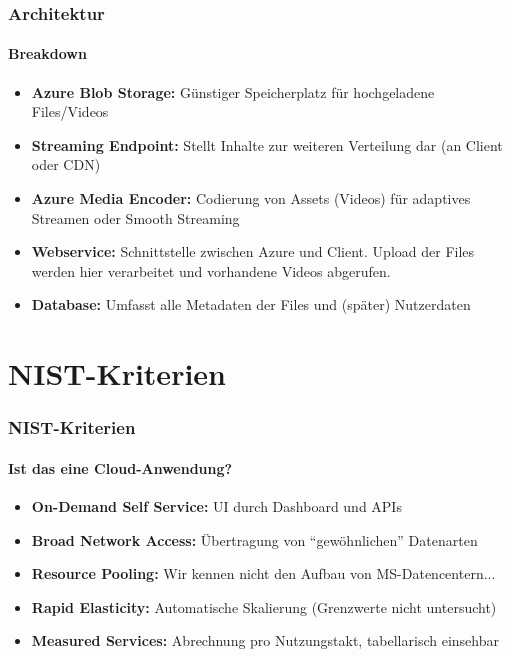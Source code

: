 \documentclass[aspectratio=169]{beamer}
\begin{document}
\begin{frame}
  \frametitle{Architektur}
  \framesubtitle{Breakdown}
  \begin{itemize}
    \item \textbf{Azure Blob Storage:} Günstiger Speicherplatz für hochgeladene Files/Videos
    \item \textbf{Streaming Endpoint:} Stellt Inhalte zur weiteren Verteilung dar (an Client oder CDN)
    \item \textbf{Azure Media Encoder:} Codierung von Assets (Videos) für adaptives Streamen oder Smooth Streaming
    \item \textbf{Webservice:} Schnittstelle zwischen Azure und Client. Upload der Files werden hier verarbeitet und vorhandene Videos abgerufen.
    \item \textbf{Database:} Umfasst alle Metadaten der Files und (später) Nutzerdaten
  \end{itemize}
\end{frame}

\section{NIST-Kriterien}
\begin{frame}
  \frametitle{NIST-Kriterien}
  \framesubtitle{Ist das eine Cloud-Anwendung?}
  \begin{itemize}
    \item \textbf{On-Demand Self Service:} UI durch Dashboard und APIs
    \item \textbf{Broad Network Access:} Übertragung von ``gewöhnlichen'' Datenarten
    \item \textbf{Resource Pooling:} Wir kennen nicht den Aufbau von MS-Datencentern...
    \item \textbf{Rapid Elasticity:} Automatische Skalierung (Grenzwerte nicht untersucht)
    \item \textbf{Measured Services:} Abrechnung pro Nutzungstakt, tabellarisch einsehbar
    \end{itemize}
\end{frame}
\end{document}
